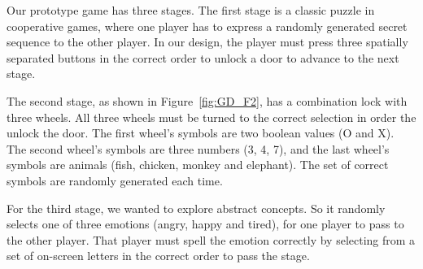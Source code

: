 


Our prototype game has three stages. The first stage is a classic puzzle in cooperative games, where one player has to express a randomly generated secret sequence to the other player. In our design, the player must press three spatially separated buttons in the correct order to unlock a door to advance to the next stage.


The second stage, as shown in Figure~\ref{fig:GD_F2}, has a combination lock with three wheels. All three wheels must be turned to the correct selection in order the unlock the door. The first wheel's symbols are two boolean values (O and X). The second wheel's symbols are three numbers (3, 4, 7), and the last wheel's symbols are animals (fish, chicken, monkey and elephant). The set of correct symbols are randomly generated each time.


For the third stage, we wanted to explore abstract concepts. So it randomly selects one of three emotions (angry, happy and tired), for one player to pass to the other player. That player must spell the emotion correctly by selecting from a set of on-screen letters in the correct order to pass the stage.

